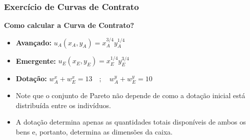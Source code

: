 \documentclass[a4paper,12pt]{article}[abntex2]
\begin{document}
\subsubsection{\textbf{Exercício de Curvas de Contrato}}

\textbf{Como calcular a Curva de Contrato?}

\begin{itemize}
    \item \textbf{Avançado:} \( u_A(x_A, y_A) = x_A^{3/4} y_A^{1/4} \)
    \item \textbf{Emergente:} \( u_E(x_E, y_E) = x_E^{1/4} y_E^{3/4} \)
    \item \textbf{Dotação:} \(w_A^x + w_E^x = 13 \quad ; \quad w_A^y + w_E^y = 10\)
\end{itemize}

\begin{itemize}
    \item Note que o conjunto de Pareto não depende de como a dotação inicial está distribuída entre os indivíduos.
    \item A dotação determina apenas as quantidades totais disponíveis de ambos os bens e, portanto, determina as dimensões da caixa.
\end{itemize}
\end{document}
